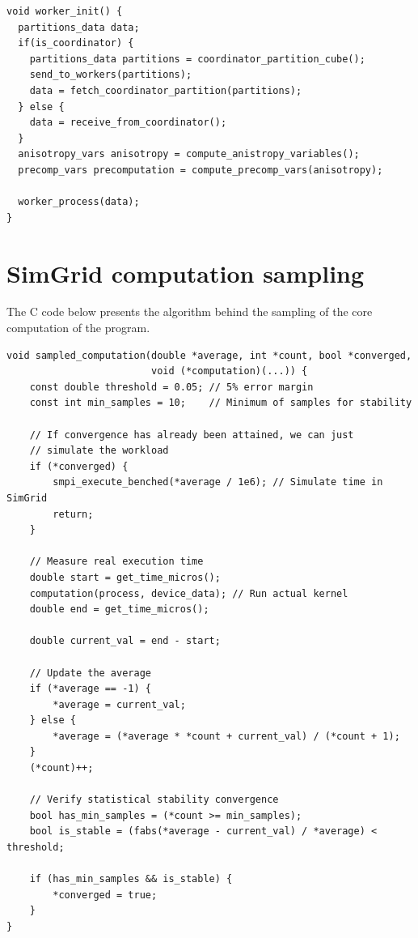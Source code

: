 \documentclass[cic,tc,english]{infufrgs}
\begin{document}
\begin{lstlisting}[style=CStyle, caption = {Worker initialization}]
void worker_init() {
  partitions_data data;
  if(is_coordinator) {
    partitions_data partitions = coordinator_partition_cube();
    send_to_workers(partitions);
    data = fetch_coordinator_partition(partitions);
  } else {
    data = receive_from_coordinator();
  }
  anisotropy_vars anisotropy = compute_anistropy_variables();
  precomp_vars precomputation = compute_precomp_vars(anisotropy);

  worker_process(data);
}
\end{lstlisting}

\chapter{SimGrid computation sampling}
\label{ap:sampled_comp}
The C code below presents the algorithm behind the
sampling of the core computation of the program.

\begin{lstlisting}[style=CStyle, caption={Sampling and convergence mechanism for computation in SimGrid}, label={lst:sampled_comp}]
void sampled_computation(double *average, int *count, bool *converged,
                         void (*computation)(...)) {
    const double threshold = 0.05; // 5% error margin
    const int min_samples = 10;    // Minimum of samples for stability

    // If convergence has already been attained, we can just
    // simulate the workload
    if (*converged) {
        smpi_execute_benched(*average / 1e6); // Simulate time in SimGrid
        return;
    }

    // Measure real execution time
    double start = get_time_micros();
    computation(process, device_data); // Run actual kernel
    double end = get_time_micros();

    double current_val = end - start;

    // Update the average
    if (*average == -1) {
        *average = current_val;
    } else {
        *average = (*average * *count + current_val) / (*count + 1);
    }
    (*count)++;

    // Verify statistical stability convergence
    bool has_min_samples = (*count >= min_samples);
    bool is_stable = (fabs(*average - current_val) / *average) < threshold;

    if (has_min_samples && is_stable) {
        *converged = true;
    }
}
\end{lstlisting}
\end{document}
